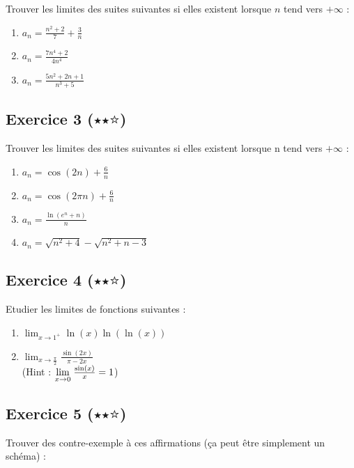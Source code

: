 \documentclass{article}
\newcommand{\Lim}[1]{\raisebox{0.0ex}{\scalebox{1}{$\displaystyle \lim_{#1}\;$}}}
\begin{document}
Trouver les limites des suites suivantes si elles existent lorsque $n$ tend vers $+\infty$ :

\begin{enumerate}
    \item $a_n = \frac{n^2 + 2}{7} + \frac{3}{n}$
    \item $a_n = \frac{7n^4 + 2}{4n^4}$
    \item $a_n = \frac{5n^2 + 2n + 1}{n^3 + 5}$
\end{enumerate}

\subsection*{Exercice 3 ($\medblackstar \medblackstar \medwhitestar$)}

Trouver les limites des suites suivantes si elles existent lorsque n tend vers $+\infty$ :

\begin{enumerate}
    \item $a_n = \cos(2n) + \frac{6}{n}$
    \item $a_n = \cos(2\pi n) + \frac{6}{n}$
    \item $a_n = \frac{\ln(e^n + n)}{n}$
    \item $a_n = \sqrt{n^2 + 4} - \sqrt{n^2 +n - 3}$
\end{enumerate}

\subsection*{Exercice 4 ($\medblackstar \medblackstar \medwhitestar$)}
\noindent Etudier les limites de fonctions suivantes :
\begin{enumerate}
    \item $\displaystyle\lim_{x \to 1^{+}}\ln(x)\ln(\ln(x))$
   
    
    \item $\displaystyle\lim_{x \to \frac{\pi}{2}}\frac{\sin(2x)}{\pi-2x}$\\
    (Hint : $\Lim{x \to 0} \frac{\sin(x)}{x} = 1$)
   
\end{enumerate}

\subsection*{Exercice 5 ($\medblackstar \medblackstar \medwhitestar$)}

Trouver des contre-exemple à ces affirmations (ça peut être simplement un schéma) :
\end{document}
